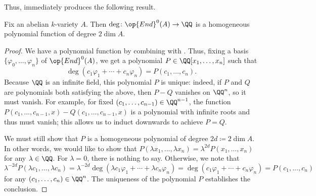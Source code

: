 \documentclass{amsart}
\begin{document}
Thus,  immediately produces the following result.
\begin{proposition} \label{prop:deg-is-poly}
	Fix an abelian $k$-variety $A$. Then $\deg\colon\op{End}^0(A)\to\QQ$ is a homogeneous polynomial function of degree $2\dim A$.
\end{proposition}
\begin{proof}
	We have a polynomial function by combining  with . Thus, fixing a basis $\{\varphi_0,\ldots,\varphi_n\}$ of $\op{End}^0(A)$, we get a polynomial $P\in\QQ[x_1,\ldots,x_n]$ such that
	\[\deg(c_1\varphi_1+\cdots+c_n\varphi_n)=P(c_1,\ldots,c_n).\]
	Because $\QQ$ is an infinite field, this polynomial $P$ is unique: indeed, if $P$ and $Q$ are polynomials both satisfying the above, then $P-Q$ vanishes on $\QQ^n$, so it must vanish. For example, for fixed $(c_1,\ldots,c_{n-1})\in\QQ^{n-1}$, the function $P(c_1,\ldots,c_{n-1},x)-Q(c_1,\ldots,c_{n-1},x)$ is a polynomial with infinite roots and thus must vanish; this allows us to induct downwards to achieve $P=Q$.

	We must still show that $P$ is a homogeneous polynomial of degree $2d\coloneqq2\dim A$. In other words, we would like to show that $P(\lambda x_1,\ldots,\lambda x_n)=\lambda^{2d}P(x_1,\ldots,x_n)$ for any $\lambda\in\QQ$. For $\lambda=0$, there is nothing to say. Otherwise, we note that
	\[\lambda^{-2d}P(\lambda c_1,\ldots,\lambda c_n)=\lambda^{-2d}\deg(\lambda c_1\varphi_1+\cdots+\lambda c_n\varphi_n)=\deg(c_1\varphi_1+\cdots+c_n\varphi_n)=P(c_1,\ldots,c_n)\]
	for any $(c_1,\ldots,c_n)\in\QQ^n$. The uniqueness of the polynomial $P$ establishes the conclusion.
\end{proof}
\end{document}
